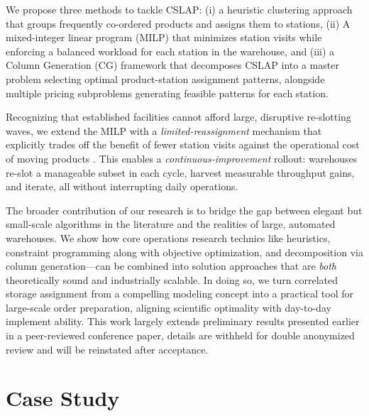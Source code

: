 \documentclass[11pt]{elsarticle}
\begin{document}
We propose three methods to tackle CSLAP: (i) a heuristic clustering approach that groups frequently co-ordered products and assigns them to stations, (ii) A mixed-integer linear program (MILP) that minimizes station visits while enforcing a balanced workload for each station in the warehouse, and (iii) a Column Generation (CG) framework that decomposes CSLAP into a master problem selecting optimal product-station assignment patterns, alongside multiple pricing subproblems generating feasible patterns for each station. 

Recognizing that established facilities cannot afford large, disruptive re-slotting waves, we extend the MILP with a \emph{limited-reassignment} mechanism that explicitly trades off the benefit of fewer station visits against the operational cost of moving products \citep{chabot2024reassignment}. This enables a \emph{continuous-improvement} rollout: warehouses re-slot a manageable subset in each cycle, harvest measurable throughput gains, and iterate, all without interrupting daily operations.

The broader contribution of our research is to bridge the gap between elegant but small-scale algorithms in the literature and the realities of large, automated warehouses. We show how core operations research technics like heuristics, constraint programming along with objective optimization, and decomposition via column generation—can be combined into solution approaches that are \emph{both} theoretically sound and industrially scalable. In doing so, we turn correlated storage assignment from a compelling modeling concept into a practical tool for large-scale order preparation, aligning scientific optimality with day-to-day implement ability.
This work largely extends preliminary results presented earlier in a peer-reviewed conference paper, details are withheld for double anonymized review and will be reinstated after acceptance.

\noindent



\section{Case Study}\label{sec:case_study}
\end{document}
